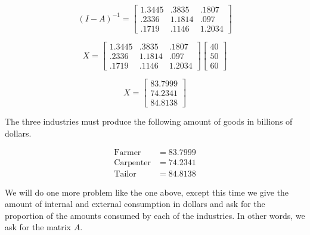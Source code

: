 \begin{solution}
    \[ (I - A)^{-1} = \begin{bmatrix}
            1.3445 & .3835  & .1807  \\
            .2336  & 1.1814 & .097   \\
            .1719  & .1146  & 1.2034
        \end{bmatrix} \]

    \[ X = \begin{bmatrix}
            1.3445 & .3835  & .1807  \\
            .2336  & 1.1814 & .097   \\
            .1719  & .1146  & 1.2034
        \end{bmatrix} \begin{bmatrix}
            40 \\
            50 \\
            60
        \end{bmatrix} \]

    \[ X = \begin{bmatrix}
            83.7999 \\
            74.2341 \\
            84.8138
        \end{bmatrix} \]

    The three industries must produce the following amount of goods in billions of dollars.

    \[
        \begin{aligned}
            \text{Farmer}    & = 83.7999 \\
            \text{Carpenter} & = 74.2341 \\
            \text{Tailor}    & = 84.8138
        \end{aligned}
    \]

\end{solution}

We will do one more problem like the one above, except this time we give the amount of internal and external consumption in dollars and ask for the proportion of the amounts consumed by each of the industries. In other words, we ask for the matrix \( A \).

